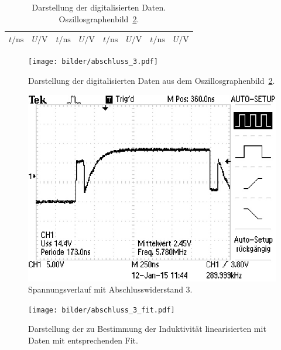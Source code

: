 \begin{table}[htpb]
  \centering
  \begin{tabular}{cc|cc|cc|cc}
    \midrule
    \midrule
    $t/\si{\nano\second}$ & $U/\si{\volt}$ &
    $t/\si{\nano\second}$ & $U/\si{\volt}$ &
    $t/\si{\nano\second}$ & $U/\si{\volt}$ &
    $t/\si{\nano\second}$ & $U/\si{\volt}$ \\
    \midrule
    
    \midrule
    \midrule
  \end{tabular}
  \caption{Darstellung der digitalisierten Daten.
    Oszillosgraphenbild~\ref{fig:abschluss_3}.}
  \label{tab:daten_abschluss_3}
\end{table}

\begin{figure}[htpb]
  \centering
  \texttt{[image: bilder/abschluss\_3.pdf]}
  \caption{Darstellung der digitalisierten Daten aus dem
    Oszillosgraphenbild~\ref{fig:abschluss_3}.}
\label{fig:abschluss_3_digitalisiert}
\end{figure}

\begin{figure}[htpb]
  \centering
  \includegraphics[scale=1.0]{bilder/abschluss/F0003TEK.JPG}
  \caption{Spannungsverlauf mit Abschlusswiderstand 3.}
  \label{fig:abschluss_3}
\end{figure}

\begin{figure}[htpb]
  \centering
  \texttt{[image: bilder/abschluss\_3\_fit.pdf]}
  \caption{Darstellung der zu Bestimmung der Induktivität
    linearisierten mit Daten mit entsprechenden Fit.}
\label{fig:abschluss_3_fit}
\end{figure}

